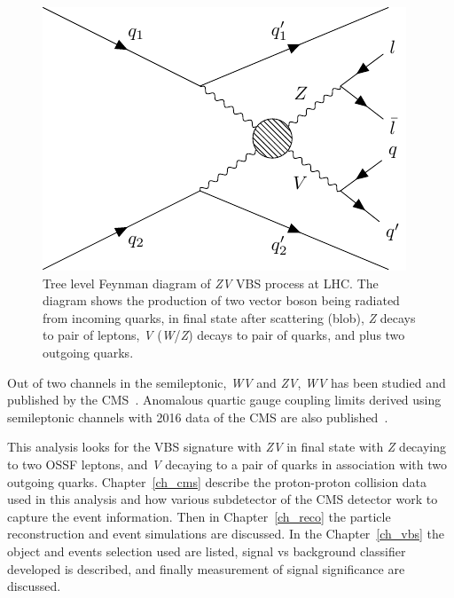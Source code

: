 \begin{figure}[!ht]
  \centering
  \begin{minipage}{0.5\textwidth}
    \includegraphics[width=\textwidth]{figures/feyn_vbs_0.pdf}
    \vspace{5pt}
  \end{minipage}
  \caption[Tree level Feynman diagram of \textit{ZV} VBS process at LHC]%
  {Tree level Feynman diagram of \textit{ZV} VBS process at LHC\@. The diagram
    shows the production of two vector boson being radiated from incoming
    quarks, in final state after scattering (blob), \textit{Z} decays
    to pair of leptons, \textit{V} (\textit{W}/\textit{Z}) decays to pair of quarks,
    and plus two outgoing quarks.
  }%
  \label{fig:feynman-vbs}
\end{figure}

Out of two channels in the semileptonic, \textit{WV} and \textit{ZV},
\textit{WV} has been studied and published by the \gls{CMS}~\cite{vbs-wv-cms-2021}.
Anomalous quartic gauge coupling limits derived using semileptonic
channels with 2016 data of the \gls{CMS} are also published~\cite{wv-vbs-aqgc}.

This analysis looks for the \gls{VBS} signature with \textit{ZV} in final state
with \textit{Z} decaying to two \gls{OSSF} leptons, and \textit{V} decaying to a pair
of quarks in association with two outgoing quarks. Chapter~\ref{ch_cms}
describe the proton-proton collision data used in this analysis and how
various subdetector of the \gls{CMS} detector work to capture the
event information. Then in Chapter~\ref{ch_reco} the particle
reconstruction and event simulations are discussed. In the
Chapter~\ref{ch_vbs} the object and events selection
used are listed, signal vs background classifier developed
is described, and finally measurement of signal significance are discussed.
